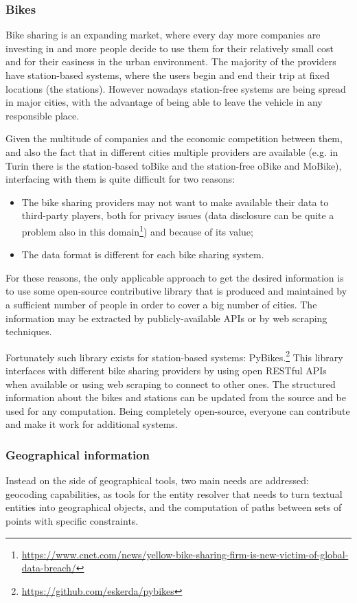 \subsubsection{Bikes}
Bike sharing is an expanding market, where every day more companies are investing in and more people decide to use them for their relatively small cost and for their easiness in the urban environment. The majority of the providers have station-based systems, where the users begin and end their trip at fixed locations (the stations). However nowadays station-free systems are being spread in major cities, with the advantage of being able to leave the vehicle in any responsible place.

Given the multitude of companies and the economic competition between them, and also the fact that in different cities multiple providers are available (e.g. in Turin there is the station-based toBike and the station-free oBike and MoBike), interfacing with them is quite difficult for two reasons:

\begin{itemize}
	\item The bike sharing providers may not want to make available their data to third-party players, both for privacy issues (data disclosure can be quite a problem also in this domain\footnote{\url{https://www.cnet.com/news/yellow-bike-sharing-firm-is-new-victim-of-global-data-breach/}}) and because of its value;
	\item The data format is different for each bike sharing system.
\end{itemize}
For these reasons, the only applicable approach to get the desired information is to use some open-source contributive library that is produced and maintained by a sufficient number of people in order to cover a big number of cities. The information may be extracted by publicly-available APIs or by web scraping techniques.

Fortunately such library exists for station-based systems: PyBikes.\footnote{\url{https://github.com/eskerda/pybikes}} This library interfaces with different bike sharing providers by using open RESTful APIs when available or using web scraping to connect to other ones. The structured information about the bikes and stations can be updated from the source and be used for any computation. Being completely open-source, everyone can contribute and make it work for additional systems.

\subsubsection{Geographical information}
Instead on the side of geographical tools, two main needs are addressed: geocoding capabilities, as tools for the entity resolver that needs to turn textual entities into geographical objects, and the computation of paths between sets of points with specific constraints.

